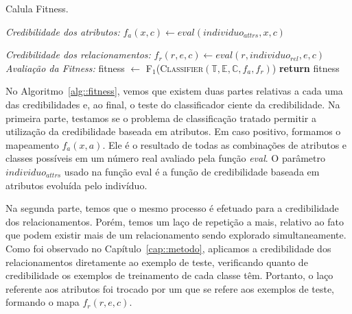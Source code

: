 \begin{algorithm}
\centering
\caption{Calula Fitness.}
\label{alg::fitness}
\begin{algorithmic}[!h]
{
{}
  \State  
  \State \textit{Credibilidade dos atributos:}
      \State $f_a(x,c) \gets eval(individuo_{attrs}, x, c)$
    \EndFor
  \EndFor
  \EndIf
  \State
  
  \State \textit{Credibilidade dos relacionamentos:}
            \State $f_r(r,e,c) \gets eval(r,individuo_{rel}, e, c)$
        \EndFor
    \EndFor
  \EndFor
  \EndIf
  \State
  \State \textit{Avaliação da Fitness:}
  \State fitness $\gets$ \textsc{F$_1$}(\textsc{Classifier}$(\mathbb{T}, \mathbb{E}, \mathbb{C}, f_a, f_r)$)
  \State \textbf{return} fitness
\EndFunction
}
\end{algorithmic}
\end{algorithm}

No Algoritmo~\ref{alg::fitness}, vemos que existem duas partes relativas a cada uma das credibilidades e, ao final, o teste do classificador ciente da credibilidade.
Na primeira parte, testamos se o problema de classificação tratado permitir a utilização da credibilidade baseada em atributos. Em caso positivo, formamos o mapeamento $f_a(x,a)$. Ele é o resultado de todas as combinações de atributos e classes possíveis em um número real avaliado pela função \textit{eval}. %
O parâmetro $individuo_{attrs}$ usado na função eval é a função de credibilidade baseada em atributos evoluída pelo indivíduo.

Na segunda parte, temos que o mesmo processo é efetuado para a credibilidade dos relacionamentos. Porém, temos um laço de repetição a mais, relativo ao fato que podem existir mais de um relacionamento sendo explorado simultaneamente. Como foi observado no Capítulo~\ref{cap::metodo}, aplicamos a credibilidade dos relacionamentos diretamente ao exemplo de teste, verificando quanto de credibilidade os exemplos de treinamento de cada classe têm. Portanto, o laço referente aos atributos foi trocado por um que se refere aos exemplos de teste, formando o mapa $f_r(r,e,c)$.

